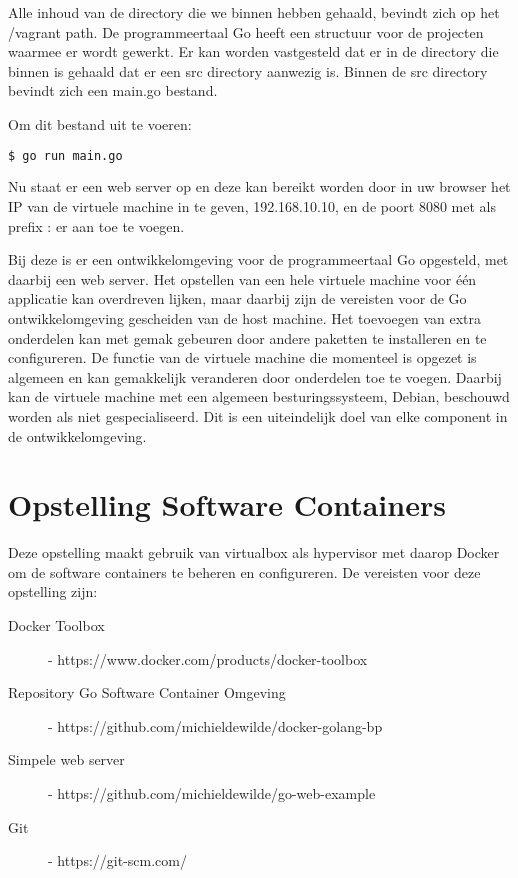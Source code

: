 Alle inhoud van de directory die we binnen hebben gehaald, bevindt zich op het /vagrant path. De programmeertaal Go heeft een structuur voor de projecten waarmee er wordt gewerkt. Er kan worden vastgesteld dat er in de directory die binnen is gehaald dat er een src directory aanwezig is. Binnen de src directory bevindt zich een main.go bestand. 

\noindent Om dit bestand uit te voeren:
\begin{lstlisting}[language=bash]
  $ go run main.go
\end{lstlisting}

Nu staat er een web server op en deze kan bereikt worden door in uw browser het IP van de virtuele machine in te geven, 192.168.10.10, en de poort 8080 met als prefix : er aan toe te voegen.

Bij deze is er een ontwikkelomgeving voor de programmeertaal Go opgesteld, met daarbij een web server. Het opstellen van een hele virtuele machine voor één applicatie kan overdreven lijken, maar daarbij zijn de vereisten voor de Go ontwikkelomgeving gescheiden van de host machine. Het toevoegen van extra onderdelen kan met gemak gebeuren door andere paketten te installeren en te configureren. De functie van de virtuele machine die momenteel is opgezet is algemeen en kan gemakkelijk veranderen door onderdelen toe te voegen. Daarbij kan de virtuele machine met een algemeen besturingssysteem, Debian, beschouwd worden als niet gespecialiseerd. Dit is een uiteindelijk doel van elke component in de ontwikkelomgeving. 

\section{Opstelling Software Containers}

Deze opstelling maakt gebruik van virtualbox als hypervisor met daarop Docker om de software containers te beheren en configureren.
De vereisten voor deze opstelling zijn:
\begin{description}
\item [Docker Toolbox] - https://www.docker.com/products/docker-toolbox
\item [Repository Go Software Container Omgeving] - https://github.com/michieldewilde/docker-golang-bp
\item [Simpele web server] - https://github.com/michieldewilde/go-web-example
\item [Git] - https://git-scm.com/
\end{description}

